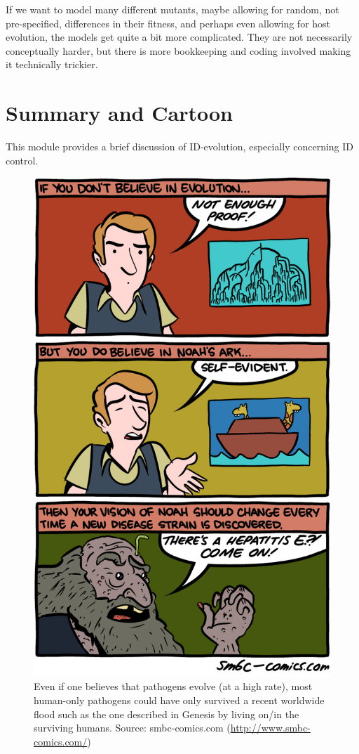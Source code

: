 \documentclass[]{book}
\theoremstyle{definition}
\theoremstyle{definition}
\theoremstyle{definition}
\theoremstyle{remark}
\begin{document}
If we want to model many different mutants, maybe allowing for random,
not pre-specified, differences in their fitness, and perhaps even
allowing for host evolution, the models get quite a bit more
complicated. They are not necessarily conceptually harder, but there is
more bookkeeping and coding involved making it technically trickier.

\section{Summary and Cartoon}\label{summary-and-cartoon-13}

This module provides a brief discussion of ID-evolution, especially
concerning ID control.

\begin{figure}
\centering
\includegraphics{./images/smbc-ID-evolution.png}
\caption{Even if one believes that pathogens evolve (at a high rate),
most human-only pathogens could have only survived a recent worldwide
flood such as the one described in Genesis by living on/in the surviving
humans. Source: smbc-comics.com (\url{http://www.smbc-comics.com/})}
\end{figure}
\end{document}
